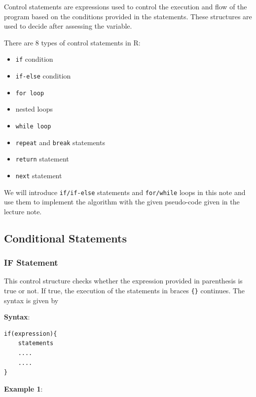 \documentclass[
]{book}
\providecommand{\tightlist}{%
  \setlength{\itemsep}{0pt}\setlength{\parskip}{0pt}}
\begin{document}
Control statements are expressions used to control the execution and flow of the program based on the conditions provided in the statements. These structures are used to decide after assessing the variable.

There are 8 types of control statements in R:

\begin{itemize}
\tightlist
\item
  \texttt{if} condition
\item
  \texttt{if-else} condition
\item
  \texttt{for\ loop}
\item
  nested loops
\item
  \texttt{while\ loop}
\item
  \texttt{repeat} and \texttt{break} statements
\item
  \texttt{return} statement
\item
  \texttt{next} statement
\end{itemize}

We will introduce \texttt{if/if-else} statements and \texttt{for/while} loops in this note and use them to implement the algorithm with the given pseudo-code given in the lecture note.

\hfill\break

\hypertarget{conditional-statements}{%
\subsection{Conditional Statements}\label{conditional-statements}}

\hypertarget{if-statement}{%
\subsubsection{IF Statement}\label{if-statement}}

This control structure checks whether the expression provided in parenthesis is true or not. If true, the execution of the statements in braces \texttt{\{\}} continues. The syntax is given by

\textbf{Syntax}:

\begin{verbatim}
if(expression){
    statements
    ....
    ....
}
\end{verbatim}

\textbf{Example 1}:
\end{document}
